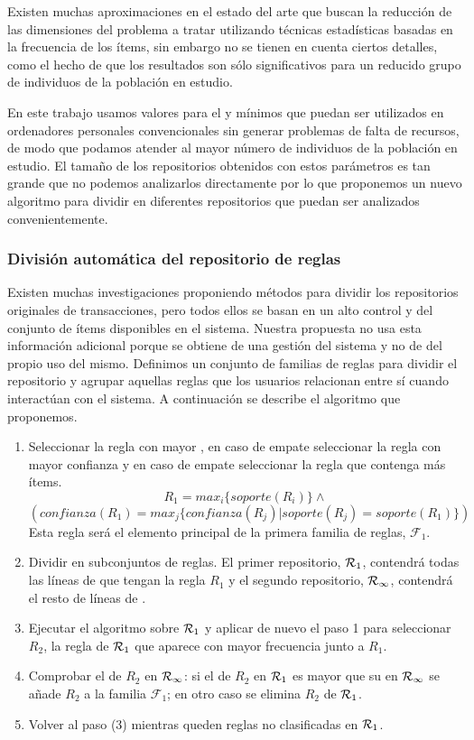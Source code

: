 Existen muchas aproximaciones en el estado del arte que buscan la reducción de las dimensiones del problema a tratar utilizando técnicas estadísticas basadas en la frecuencia de los ítems, sin embargo no se tienen en cuenta ciertos detalles, como el hecho de que los resultados son sólo significativos para un reducido grupo de individuos de la población en estudio.

En este trabajo usamos valores para el \soporte y \confianza mínimos que puedan ser utilizados en ordenadores personales convencionales sin generar problemas de falta de recursos, de modo que podamos atender al mayor número de individuos de la población en estudio. El tamaño de los repositorios \R obtenidos con estos parámetros es tan grande que no podemos analizarlos directamente por lo que proponemos un nuevo algoritmo para dividir \R en diferentes repositorios que puedan ser analizados convenientemente.



\subsubsection{División automática del repositorio de reglas}
Existen muchas investigaciones proponiendo métodos para dividir los repositorios originales de transacciones, pero todos ellos se basan en un alto control y \clasificacion del conjunto de ítems disponibles en el sistema. Nuestra propuesta no usa esta información adicional porque se obtiene de una gestión del sistema y no de del propio uso del mismo. Definimos un conjunto de familias de reglas para dividir el repositorio \R y agrupar aquellas reglas que los usuarios relacionan entre sí cuando interactúan con el sistema. A continuación se describe el algoritmo que proponemos.

\begin{enumerate}
  \item Seleccionar la regla con mayor \soporte, en caso de empate seleccionar la regla con mayor confianza y en caso de empate seleccionar la regla que contenga más ítems.
  $$R_1 = max_i\{soporte(R_i)\} \wedge$$
  $$\left(confianza(R_1) = max_j\{confianza(R_j) | soporte(R_j) = soporte(R_1)\} \right)$$
  Esta regla será el elemento principal de la primera familia de reglas, $\mathcal{F}_1$.
  \item Dividir \R en subconjuntos de reglas. El primer repositorio, $\R_1$, contendrá todas las líneas de \R que tengan la regla $R_1$ y el segundo repositorio, $\R_\infty$, contendrá el resto de líneas de \R.
  \item Ejecutar el algoritmo \apriori sobre $\R_1$ y aplicar de nuevo el paso 1 para seleccionar $R_2$, la regla de $\R_1$ que aparece con mayor frecuencia junto a $R_1$.
  \item Comprobar el \soporte de $R_2$ en $\R_\infty$: si el \soporte de $R_2$ en $\R_1$ es mayor que su \soporte en $\R_\infty$ se añade $R_2$ a la familia $\mathcal{F}_1$; en otro caso se elimina $R_2$ de $\R_1$.
  \item Volver al paso (3) mientras queden reglas no clasificadas en $\R_1$.
\end{enumerate}

